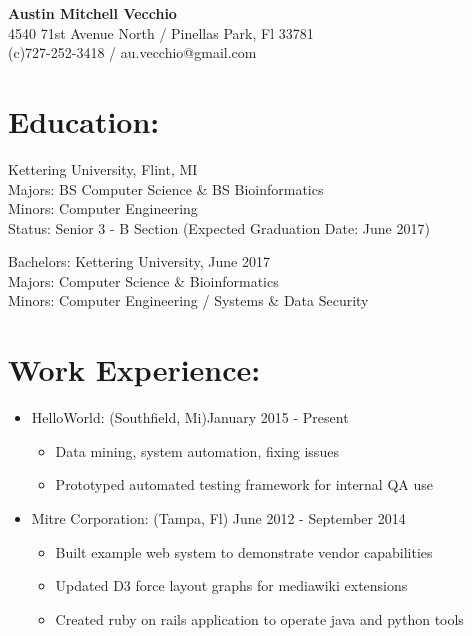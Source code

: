 \documentclass{res}
\begin{document}
\begin{center}
\LARGE{\textbf{Austin Mitchell Vecchio}}\\
\normalsize{
4540 71st Avenue North / Pinellas Park, Fl 33781\\
(c)727-252-3418 / au.vecchio@gmail.com
}
\end{center}

\section{Education:}
Kettering University, Flint, MI\\
Majors: BS Computer Science \& BS Bioinformatics\\
Minors: Computer Engineering\\
Status: Senior 3 - B Section (Expected Graduation Date: June 2017)


Bachelors: Kettering University, June 2017\\
Majors: Computer Science \& Bioinformatics\\
Minors: Computer Engineering / Systems \& Data Security\\

\section{Work Experience:}
\begin{itemize}[leftmargin=*]
\item HelloWorld: (Southfield, Mi)\hfill January 2015 - Present
\begin{itemize}[label=$\circ$]
\item Data mining, system automation, fixing issues
\item Prototyped automated testing framework for internal QA use
\end{itemize}
\item Mitre Corporation: (Tampa, Fl) \hfill June 2012 - September 2014
\begin{itemize}[label=$\circ$]
\item Built example web system to demonstrate vendor capabilities
\item Updated D3 force layout graphs for mediawiki extensions
\item Created ruby on rails application to operate java and python tools
\end{itemize}
\end{itemize}
\end{document}
